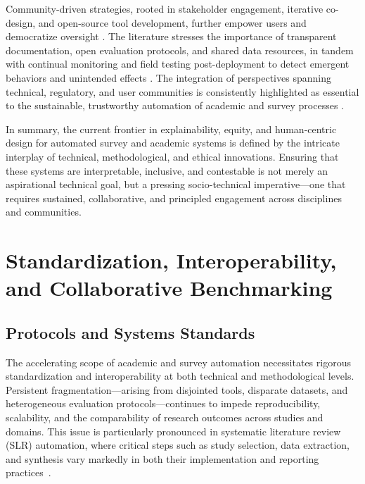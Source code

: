 Community-driven strategies, rooted in stakeholder engagement, iterative co-design, and open-source tool development, further empower users and democratize oversight \cite{ref64}\cite{ref70}\cite{ref76}\cite{ref80}\cite{ref100}\cite{ref105}\cite{ref106}. The literature stresses the importance of transparent documentation, open evaluation protocols, and shared data resources, in tandem with continual monitoring and field testing post-deployment to detect emergent behaviors and unintended effects \cite{ref76}\cite{ref80}\cite{ref85}\cite{ref100}\cite{ref105}. The integration of perspectives spanning technical, regulatory, and user communities is consistently highlighted as essential to the sustainable, trustworthy automation of academic and survey processes \cite{ref39}\cite{ref76}\cite{ref83}\cite{ref91}\cite{ref93}\cite{ref99}\cite{ref100}\cite{ref106}.

In summary, the current frontier in explainability, equity, and human-centric design for automated survey and academic systems is defined by the intricate interplay of technical, methodological, and ethical innovations. Ensuring that these systems are interpretable, inclusive, and contestable is not merely an aspirational technical goal, but a pressing socio-technical imperative—one that requires sustained, collaborative, and principled engagement across disciplines and communities.

\section{Standardization, Interoperability, and Collaborative Benchmarking}

\subsection{Protocols and Systems Standards}

The accelerating scope of academic and survey automation necessitates rigorous standardization and interoperability at both technical and methodological levels. Persistent fragmentation—arising from disjointed tools, disparate datasets, and heterogeneous evaluation protocols—continues to impede reproducibility, scalability, and the comparability of research outcomes across studies and domains. This issue is particularly pronounced in systematic literature review (SLR) automation, where critical steps such as study selection, data extraction, and synthesis vary markedly in both their implementation and reporting practices~\cite{ref29,ref37,ref38,ref43,ref61,ref62,ref63,ref68,ref78,ref80,ref86,ref87,ref88,ref89,ref90,ref96,ref98,ref106}.

